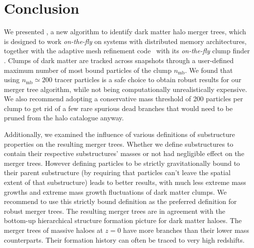 \chapter{Conclusion}\label{chap:acacia-conclusion}


We presented \acacia, a new  algorithm to identify dark matter
halo  merger trees,  which is  designed  to work  \emph{on-the-fly}  on
systems  with  distributed  memory architectures,  together  with  the
adaptive mesh refinement code \ramses\ with its \emph{on-the-fly} clump
finder  \phew.  Clumps  of dark  matter are  tracked across  snapshots
through a user-defined  maximum number of most bound  particles of the
clump  $n_{\mathrm{mb}}$.   We found  that  using  $n_{\mathrm{mb}} \simeq  200$  tracer
particles is  a safe choice  to obtain  robust results for  our merger
tree  algorithm,  while   not  being  computationally  unrealistically
expensive.  We  also recommend adopting a  conservative mass threshold
of 200  particles per  clump to get  rid of a  few rare  spurious dead
branches that would need to be pruned from the halo catalogue anyway.

Additionally,  we examined  the  influence of  various definitions  of
substructure  properties on  the  resulting merger  trees. Whether  we
define substructures to contain their respective substructures' masses
or not  had negligible effect  on the merger trees.   However defining
particles  to  be  strictly  gravitationally  bound  to  their  parent
substructure  (by requiring  that  particles can't  leave the  spatial
extent of that  substructure) leads to better results,  with much less
extreme  mass growths  and extreme  mass growth  fluctuations of  dark
matter clumps.  We recommend to  use this strictly bound definition as
the  preferred  definition for  robust  merger  trees.  The  resulting
merger  trees  are  in   agreement  with  the  bottom-up  hierarchical
structure formation picture  for dark matter haloes.  The merger trees
of massive  haloes at $z=0$ have  more branches than their  lower mass
counterparts.  Their  formation history  can often  be traced  to very
high redshifts.

